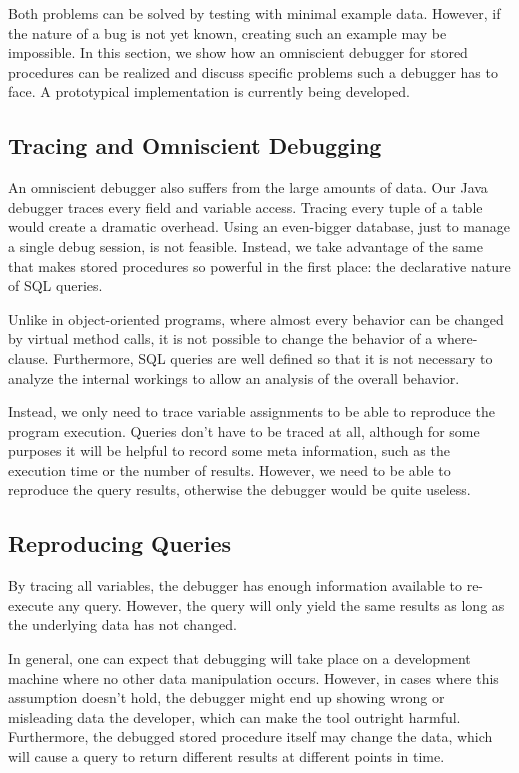 \documentclass[english]{scrartcl}
\begin{document}
Both problems can be solved by testing with minimal example data.
However, if the nature of a bug is not yet known, creating such an example may be impossible.
In this section, we show how an omniscient debugger for stored procedures can be realized and discuss specific problems such a debugger has to face.
A prototypical implementation is currently being developed.

\subsection{Tracing and Omniscient Debugging}

An omniscient debugger also suffers from the large amounts of data.
Our Java debugger traces every field and variable access.
Tracing every tuple of a table would create a dramatic overhead.
Using an even-bigger database, just to manage a single debug session, is not feasible.
Instead, we take advantage of the same that makes stored procedures so powerful in the first place: the declarative nature of SQL queries.

Unlike in object-oriented programs, where almost every behavior can be changed by virtual method calls, it is not possible to change the behavior of a where-clause.
Furthermore, SQL queries are well defined so that it is not necessary to analyze the internal workings to allow an analysis of the overall behavior.

Instead, we only need to trace variable assignments to be able to reproduce the program execution.
Queries don't have to be traced at all, although for some purposes it will be helpful to record some meta information, such as the execution time or the number of results.
However, we need to be able to reproduce the query results, otherwise the debugger would be quite useless.

\subsection{Reproducing Queries}

By tracing all variables, the debugger has enough information available to re-execute any query.
However, the query will only yield the same results as long as the underlying data has not changed.

In general, one can expect that debugging will take place on a development machine where no other data manipulation occurs.
However, in cases where this assumption doesn't hold, the debugger might end up showing wrong or misleading data the developer, which can make the tool outright harmful.
Furthermore, the debugged stored procedure itself may change the data, which will cause a query to return different results at different points in time.
\end{document}
